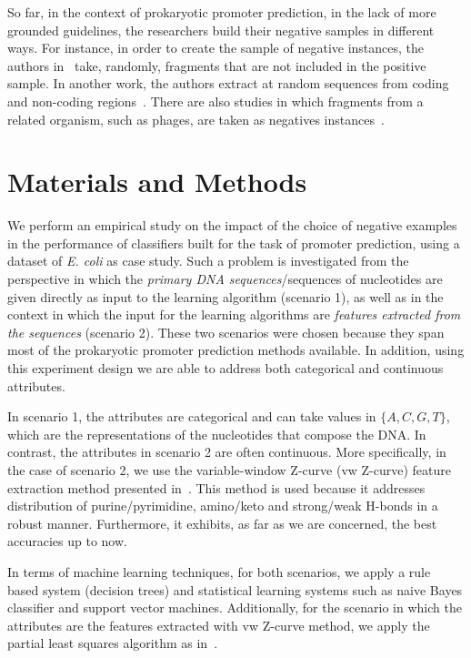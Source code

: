 \documentclass[conference]{IEEEtran}
\begin{document}
So far, in the context of prokaryotic promoter prediction, in the lack of more grounded guidelines, the researchers build their negative samples in different ways. For instance, in order to create the sample of negative instances, the authors in~\cite{bland2010} take, randomly, fragments that are not included in the positive sample. In another work, the authors extract at random sequences from coding and non-coding regions~\cite{hutchinson1996,gordon2003}. There are also studies in which fragments from a related organism, such as phages, are taken as negatives instances~\cite{towell1993,monteiro2005}.

\section{Materials and Methods}
\label{sec:methods}

We perform an empirical study on the impact of the choice of negative examples in the performance of classifiers built for the task of promoter prediction, using a dataset of {\it E. coli} as case study. Such a problem is investigated from the perspective in which the {\it primary DNA sequences}/sequences of nucleotides are given directly as input to the learning algorithm (scenario 1), as well as in the context in which the input for the learning algorithms are {\it features extracted from the sequences} (scenario 2). These two scenarios were chosen because they span most of the prokaryotic promoter prediction methods available. In addition, using this experiment design we are able to address both categorical and continuous attributes.

In scenario 1, the attributes are categorical and can take values in $\{A,C,G,T\}$, which are the representations of the nucleotides that compose the DNA. In contrast, the attributes in scenario 2 are often continuous. More specifically, in the case of scenario 2, we use the variable-window Z-curve (vw Z-curve) feature extraction method presented in~\cite{song2011a}.  This method is used because it addresses distribution of purine/pyrimidine, amino/keto and strong/weak H-bonds in a robust manner. Furthermore, it exhibits, as far as we are concerned, the best accuracies up to now.

In terms of machine learning techniques, for both scenarios, we apply a rule based system (decision trees) and statistical learning systems such as naive Bayes classifier and support vector machines. Additionally, for the scenario in which the attributes are the features extracted with vw Z-curve method, we apply the partial least squares algorithm as in~\cite{song2011a}. 
\end{document}
